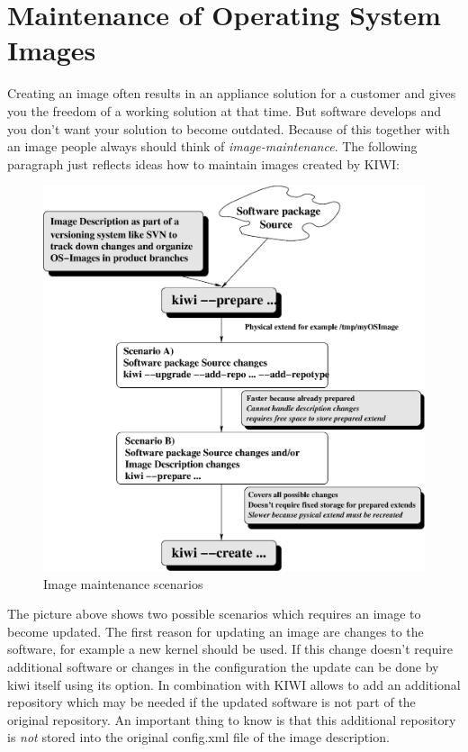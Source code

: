 \chapter{Maintenance of Operating System Images}
\label{chapter:maintain}
\minitoc

Creating an image often results in an appliance solution for a
customer and gives you the freedom of a working solution at that
time. But software develops and you don't want your solution to
become outdated. Because of this together with an image people always
should think of \emph{image-maintenance}. The following paragraph
just reflects ideas how to maintain images created by KIWI:

\begin{figure}[h]
\centering
\includegraphics[scale=0.5]{pictures/maintain.eps}
\caption{Image maintenance scenarios}
\label{fig:maintenance}
\end{figure}

The picture above shows two possible scenarios which requires an
image to become updated. The first reason for updating an image
are changes to the software, for example a new kernel should be
used. If this change doesn't require additional software or changes
in the configuration the update can be done by kiwi itself using
its  option. In combination with 
KIWI allows to add an additional repository which may be needed if
the updated software is not part of the original repository. An
important thing to know is that this additional repository is \emph{not}
stored into the original config.xml file of the image description.

